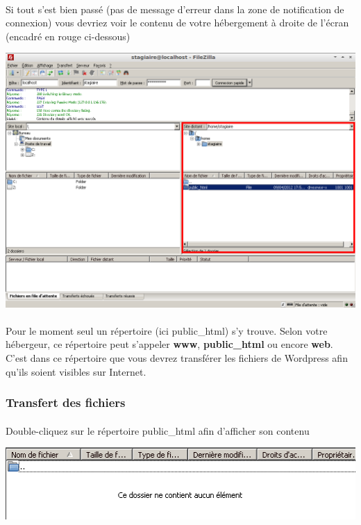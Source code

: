 \documentclass[10pt,a4paper]{article}
\begin{document}
\paragraph{}Si tout s'est bien passé (pas de message d'erreur dans la zone de notification de connexion) vous devriez voir le contenu de votre hébergement à droite de l'écran (encadré en rouge ci-dessous)
\begin{center}
\includegraphics[scale=0.35]{img/0033.png}
\end{center}
\paragraph{}Pour le moment seul un répertoire (ici public\_html) s'y trouve. Selon votre hébergeur, ce répertoire peut s'appeler \textbf{www}, \textbf{public\_html} ou encore \textbf{web}. C'est dans ce répertoire que  vous devrez transférer les fichiers de Wordpress afin qu'ils soient visibles sur Internet.
\subsubsection{Transfert des fichiers}
\paragraph{}Double-cliquez sur le répertoire public\_html afin d'afficher son contenu
\begin{center}
\includegraphics[scale=0.5]{img/0034.png}
\end{center}
\end{document}
